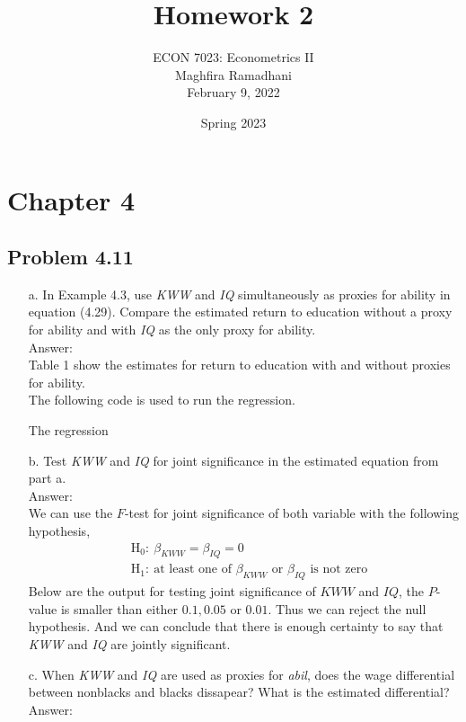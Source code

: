 \documentclass[10pt]{article}
\begin{document}
 
\title{Homework 2}
\author{ECON 7023: Econometrics II\\
Maghfira Ramadhani\\
February 9, 2022}
\date{Spring 2023}
\maketitle

\section*{Chapter 4}
\subsection*{Problem 4.11}
\begin{enumerate}
\item[a.] In Example 4.3, use \textit{KWW} and \textit{IQ} simultaneously as proxies for ability in equation (4.29). Compare the estimated return to education without a proxy for ability and with \textit{IQ} as the only proxy for ability.
\\ Answer: \\
Table 1 show the estimates for return to education with and without proxies for ability.
\\
The following code is used to run the regression.

The regression 

\item[b.] Test \textit{KWW} and \textit{IQ} for joint significance in the estimated equation from part a.
\\ Answer:\\
We can use the $F$-test for joint significance of both variable with the following hypothesis,
\begin{align*}
    &\text{H}_0:\ \beta_{KWW}=\beta_{IQ}=0\\
    &\text{H}_1:\ \text{at least one of }\beta_{KWW}\text{ or }\beta_{IQ} \text{ is not zero}
\end{align*}
Below are the output for testing joint significance of $KWW$ and $IQ$, the $P$-value is smaller than either $0.1, 0.05$ or $0.01$. Thus we can reject the null hypothesis. And we can conclude that there is enough certainty to say that \textit{KWW} and \textit{IQ} are jointly significant.
\\


\item[c.] When \textit{KWW} and \textit{IQ} are used as proxies for \textit{abil}, does the wage differential between nonblacks and blacks dissapear? What is the estimated differential?
\\ Answer:\\


\end{enumerate}
\end{document}
